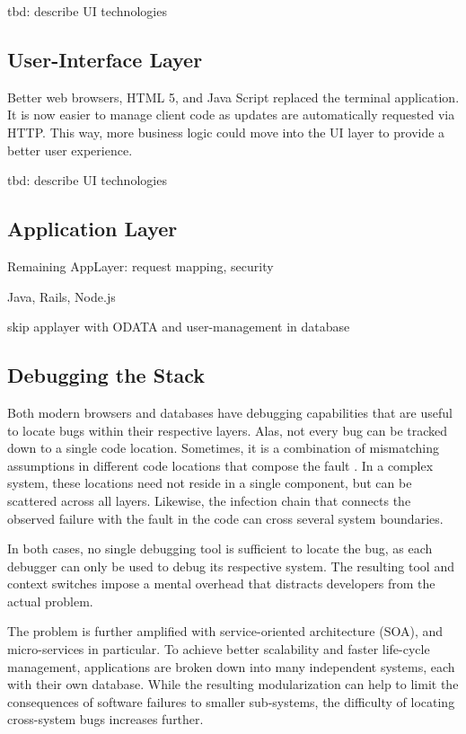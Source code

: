 tbd: describe UI technologies

\subsection{User-Interface Layer}

Better web browsers, HTML 5, and Java Script replaced the terminal application.
It is now easier to manage client code as updates are automatically requested via HTTP.
This way, more business logic could move into the UI layer to provide a better user experience.

tbd: describe UI technologies

\subsection{Application Layer}

Remaining AppLayer: request mapping, security

Java, Rails, Node.js

skip applayer with ODATA and user-management in database

\subsection{Debugging the Stack}

Both modern browsers and databases have debugging capabilities that are useful to locate bugs within their respective layers.
Alas, not every bug can be tracked down to a single code location. 
Sometimes, it is a combination of mismatching assumptions in different code locations that compose the fault .
In a complex system, these locations need not reside in a single component, but can be scattered across all layers.
Likewise, the infection chain that connects the observed failure with the fault in the code can cross several system boundaries.

In both cases, no single debugging tool is sufficient to locate the bug, as each debugger can only be used to debug its respective system.
The resulting tool and context switches impose a mental overhead that distracts developers from the actual problem.

The problem is further amplified with service-oriented architecture (SOA), and micro-services in particular.
To achieve better scalability and faster life-cycle management, applications are broken down into many independent systems, each with their own database.
While the resulting modularization can help to limit the consequences of software failures to smaller sub-systems, the difficulty of locating cross-system bugs increases further.

